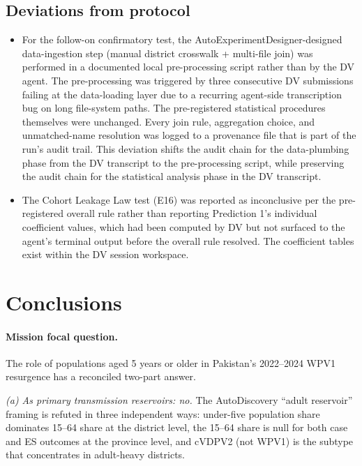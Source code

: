 \documentclass[11pt]{article}
\begin{document}
\subsection{Deviations from protocol}

\begin{itemize}[noitemsep]
\item For the follow-on confirmatory test, the AutoExperimentDesigner-designed data-ingestion step (manual district crosswalk + multi-file join) was performed in a documented local pre-processing script rather than by the DV agent. The pre-processing was triggered by three consecutive DV submissions failing at the data-loading layer due to a recurring agent-side transcription bug on long file-system paths. The pre-registered statistical procedures themselves were unchanged. Every join rule, aggregation choice, and unmatched-name resolution was logged to a provenance file that is part of the run's audit trail. This deviation shifts the audit chain for the data-plumbing phase from the DV transcript to the pre-processing script, while preserving the audit chain for the statistical analysis phase in the DV transcript.
\item The Cohort Leakage Law test (E16) was reported as inconclusive per the pre-registered overall rule rather than reporting Prediction 1's individual coefficient values, which had been computed by DV but not surfaced to the agent's terminal output before the overall rule resolved. The coefficient tables exist within the DV session workspace.
\end{itemize}

\section{Conclusions}

\paragraph{Mission focal question.} The role of populations aged 5 years or older in Pakistan's 2022--2024 WPV1 resurgence has a reconciled two-part answer.

\emph{(a) As primary transmission reservoirs: no.} The AutoDiscovery ``adult reservoir'' framing is refuted in three independent ways: under-five population share dominates 15--64 share at the district level, the 15--64 share is null for both case and ES outcomes at the province level, and cVDPV2 (not WPV1) is the subtype that concentrates in adult-heavy districts.
\end{document}
